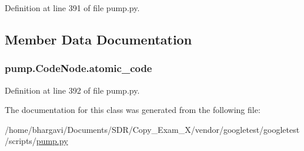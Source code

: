 Definition at line 391 of file pump.\+py.



\subsection{Member Data Documentation}
\subsubsection[{\texorpdfstring{atomic\+\_\+code}{atomic_code}}]{\setlength{\rightskip}{0pt plus 5cm}pump.\+Code\+Node.\+atomic\+\_\+code}\hypertarget{classpump_1_1_code_node_ac7251110cc987c709e0e17d95521993e}{}\label{classpump_1_1_code_node_ac7251110cc987c709e0e17d95521993e}


Definition at line 392 of file pump.\+py.



The documentation for this class was generated from the following file\+:\begin{DoxyCompactItemize}
\item 
/home/bhargavi/\+Documents/\+S\+D\+R/\+Copy\+\_\+\+Exam\+\_\+X/vendor/googletest/googletest/scripts/\hyperlink{pump_8py}{pump.\+py}\end{DoxyCompactItemize}
